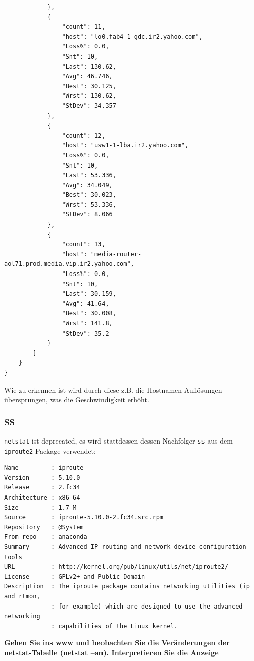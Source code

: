\begin{verbatim}
            },
            {
                "count": 11,
                "host": "lo0.fab4-1-gdc.ir2.yahoo.com",
                "Loss%": 0.0,
                "Snt": 10,
                "Last": 130.62,
                "Avg": 46.746,
                "Best": 30.125,
                "Wrst": 130.62,
                "StDev": 34.357
            },
            {
                "count": 12,
                "host": "usw1-1-lba.ir2.yahoo.com",
                "Loss%": 0.0,
                "Snt": 10,
                "Last": 53.336,
                "Avg": 34.049,
                "Best": 30.023,
                "Wrst": 53.336,
                "StDev": 8.066
            },
            {
                "count": 13,
                "host": "media-router-aol71.prod.media.vip.ir2.yahoo.com",
                "Loss%": 0.0,
                "Snt": 10,
                "Last": 30.159,
                "Avg": 41.64,
                "Best": 30.008,
                "Wrst": 141.8,
                "StDev": 35.2
            }
        ]
    }
}
\end{verbatim}

Wie zu erkennen ist wird durch diese z.B. die Hostnamen-Auflösungen
übersprungen, was die Geschwindigkeit erhöht.

\hypertarget{ss}{%
\subsubsection{SS}\label{ss}}

\texttt{netstat} ist deprecated, es wird stattdessen dessen Nachfolger
\texttt{ss} aus dem \texttt{iproute2}-Package verwendet:

\begin{verbatim}
Name         : iproute
Version      : 5.10.0
Release      : 2.fc34
Architecture : x86_64
Size         : 1.7 M
Source       : iproute-5.10.0-2.fc34.src.rpm
Repository   : @System
From repo    : anaconda
Summary      : Advanced IP routing and network device configuration tools
URL          : http://kernel.org/pub/linux/utils/net/iproute2/
License      : GPLv2+ and Public Domain
Description  : The iproute package contains networking utilities (ip and rtmon,
             : for example) which are designed to use the advanced networking
             : capabilities of the Linux kernel.
\end{verbatim}

\textbf{Gehen Sie ins www und beobachten Sie die Veränderungen der
netstat-Tabelle (netstat --an). Interpretieren Sie die Anzeige}

